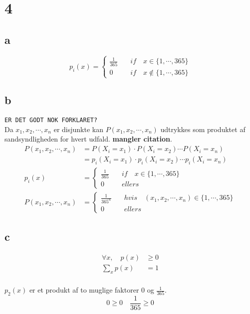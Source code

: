 \documentclass[11pt]{article}
\begin{document}
\section*{4}
\label{sec:orgacc3a3f}
\subsection*{a}
\label{sec:org673380d}
\begin{equation}
p_i(x) =
\begin{cases}
\frac{1}{365} & \quad if \quad x \in \{1,\cdots,365\}\\
0 & \quad if \quad x \notin \{1,\cdots,365\}
\end{cases}
\end{equation}
\subsection*{b}
\label{sec:orga0002ee}
\texttt{ER DET GODT NOK FORKLARET?} \\
Da \(x_1,x_2,\cdots,x_n\) er disjunkte kan \(P(x_1,x_2,\cdots,x_n)\) udtrykkes som produktet af sandsyndligheden for hvert udfald. \textbf{mangler citation}.
\begin{align}
P(x_1,x_2,\cdots,x_n) &= P(X_i=x_1) \cdot P(X_i=x_2) \cdots P(X_i=x_n)\\
&= p_i(X_i=x_1) \cdot p_i(X_i=x_2) \cdots p_i(X_i=x_n)\\
p_i(x) &=
\begin{cases}
\frac{1}{365} & \quad if \quad x \in \{1,\cdots,365\}\\
0 & \quad ellers
\end{cases} \\
P(x_1,x_2,\cdots,x_n) &=
\begin{cases}
\frac{1}{365^n} & \quad hvis \quad (x_1,x_2,\cdots,x_n) \in \{1,\cdots,365\}\\
0 & \quad ellers
\end{cases}
\end{align}
\subsection*{c}
\label{sec:orgb4abdde}
\begin{align}
\forall x, \quad p(x) &\ge 0 \\
\sum_x p(x) &= 1 \\
\end{align}

\(p_2(x)\) er et produkt af to muglige faktorer \(0\) og \(\frac{1}{365}\).
\[0 \ge 0 \quad \frac{1}{365} \ge 0\]
\end{document}
